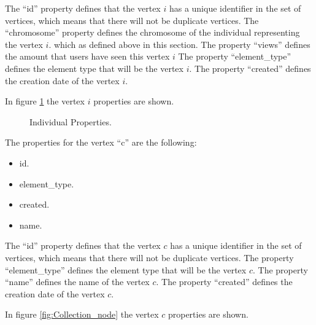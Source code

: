 The “id” property defines that the vertex $i$ has a unique identifier in the set
of vertices, which means that there will not be duplicate vertices. The
“chromosome” property defines the chromosome of the individual representing the
vertex $i$. which as defined above in this section. The property “views” defines
the amount that users have seen this vertex $i$ The property “element\_type”
defines the element type that will be the vertex $i$. The property “created”
defines the creation date of the vertex $i$.



In figure \ref{fig:Individual_node} the vertex $i$ properties are shown.

\begin{figure}
\captionsetup{justification=centering,margin=2cm}
\centering
\setlength\fboxsep{0pt}
\setlength\fboxrule{0.7pt}
\caption{Individual Properties.}
\label{fig:Individual_node}
\end{figure}

The properties for the vertex “c” are the following:

\begin{itemize}
\item id.
\item element\_type.
\item created.
\item name.
\end{itemize}

The “id” property defines that the vertex $c$ has a unique identifier in the set
of vertices, which means that there will not be duplicate vertices. The property
“element\_type” defines the element type that will be the vertex $c$. The
property “name” defines the name of the vertex $c$. The property “created”
defines the creation date of the vertex $c$.

In figure \ref{fig:Collection_node} the vertex $c$ properties are shown.

